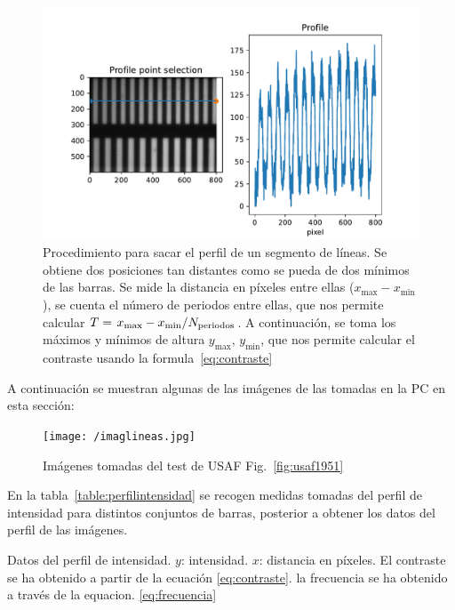 \documentclass{./packages/optica-article}
\begin{document}
\begin{figure}[!h]
	\includegraphics[width=\textwidth]{profile-lines.pdf}
	\caption{Procedimiento para sacar el perfil de un segmento de líneas. Se obtiene dos posiciones tan distantes como se pueda de dos mínimos de las barras. Se mide la distancia en píxeles entre ellas ($x_{\max} - x_{\min} $), se cuenta el número de periodos entre ellas, que nos permite calcular $T = \flatfrac{x_{\max} - x_{\min} }{N_{\textrm{periodos}}}$. A continuación,  se toma los máximos y mínimos de altura $y_{\max}$, $y_{\min}$, que nos permite calcular el contraste usando la formula~\ref{eq:contraste} }
	\label{fig:perfil:example}
\end{figure}

A continuación se muestran algunas de las imágenes de las tomadas en la PC en esta sección:

\begin{figure}[!h]
	\texttt{[image: /imaglineas.jpg]}
	\caption{Imágenes tomadas del test de USAF Fig.~\ref{fig:usaf1951}}
	\label{fig:images:example}
\end{figure}


En la tabla~\ref{table:perfilintensidad} se recogen medidas tomadas del perfil de intensidad para distintos conjuntos de barras, posterior a obtener los datos del perfil de las imágenes.

\begin{table}[p]
	\centering
	\caption{Datos del perfil de intensidad. $y$: intensidad. $x$: distancia en píxeles. El contraste se ha obtenido a partir de la ecuación \ref{eq:contraste}. la frecuencia se ha obtenido a través de la equacion. \ref{eq:frecuencia}}%
	\label{table:perfilintensidad}
\end{table}
\end{document}
